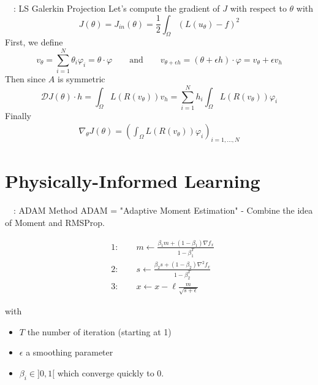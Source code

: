 \begin{frame}{\appendixname~~: LS Galerkin Projection}
	Let's compute the gradient of $J$ with respect to $\theta$ with
	\begin{equation*}
		J(\theta)=J_{in}(\theta)=\frac{1}{2}\int_\Omega (L(u_\theta) - f)^2
	\end{equation*}
	First, we define
	\begin{equation*}
		v_\theta=\sum_{i=1}^{N} \theta_i \varphi_i=\theta\cdot\varphi \qquad \text{and} \qquad v_{\theta+\epsilon h}=(\theta+\epsilon h)\cdot\varphi=v_\theta+\epsilon v_h
	\end{equation*}
	Then since $A$ is symmetric
	\begin{equation*}
		\mathcal{D}J(\theta)\cdot h = \int_\Omega L(R(v_\theta))v_h = \sum_{i=1}^N h_i\int_\Omega L(R(v_\theta))\varphi_i
	\end{equation*}
	Finally
	\begin{align*}
		\nabla_\theta J(\theta) = \left(\int_\Omega L(R(v_\theta))\varphi_i\right)_{i=1,\dots,N}
	\end{align*}
\end{frame}
\addtocounter{appendixframenumber}{1}

\section{Physically-Informed Learning}

\begin{frame}{\appendixname~\theappendixframenumber~: ADAM Method}
	ADAM = "Adaptive Moment Estimation" - Combine the idea of Moment and RMSProp.
	
	\begin{align*}
		&1: \qquad m \leftarrow \frac{\beta_1 m +  (1-\beta_1) \nabla f_{x}}{1-\beta_1^T}\\
		&2: \qquad s \leftarrow \frac{\beta_2 s +  (1-\beta_2) \nabla^2 f_{x}}{1-\beta_2^T}\\
		&3: \qquad x \leftarrow x-  \ell \frac{m }{\sqrt{s+\epsilon}} 
	\end{align*}
	
	with 
	\begin{itemize}[\textbullet]
		\item $T$ the number of iteration (starting at 1) 
		\item $\epsilon$ a smoothing parameter
		\item $\beta_i \in ]0,1[$ which converge quickly to 0. 
	\end{itemize}	
\end{frame}
\addtocounter{appendixframenumber}{1}

